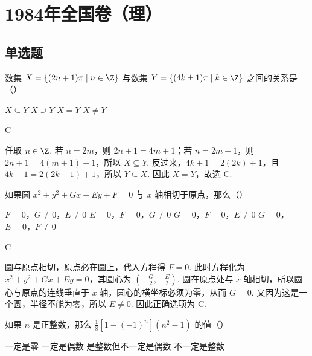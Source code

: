 \chapter{1984年全国卷（理）}

\section{单选题}

\begin{problem}

数集 \(X = \{(2n + 1)\pi\mid n\in\Z\}\) 与数集 \(Y = \{(4k \pm 1)\pi\mid k\in\Z\}\) 之间的关系是（\quad）

\choices
    {\(X \subseteq Y\)}
    {\(X \supseteq Y\)}
    {\(X = Y\)}
    {\(X \neq Y\)}
\end{problem}

\begin{answer}
C
\end{answer}

\begin{solution}
任取 \(n\in\Z\). 若 \(n=2m\)，则 \(2n+1=4m+1\)；若 \(n=2m+1\)，则 \(2n+1=4(m+1)-1\)，所以 \(X\subseteq Y\). 反过来，\(4k+1=2(2k)+1\)，且 \(4k-1=2(2k-1)+1\)，所以 \(Y\subseteq X\). 因此 \(X=Y\)，故选 C.
\end{solution}

\begin{problem}

如果圆 \(x^{2} + y^{2} + Gx + Ey + F = 0\) 与 \(x\) 轴相切于原点，那么（\quad）

\choices
    {\(F = 0\)，\(G \neq 0\)，\(E \neq 0\)}
    {\(E = 0\)，\(F = 0\)，\(G \neq 0\)}
    {\(G = 0\)，\(F = 0\)，\(E \neq 0\)}
    {\(G = 0\)，\(E = 0\)，\(F \neq 0\)}
\end{problem}

\begin{answer}
C
\end{answer}

\begin{solution}
圆与原点相切，原点必在圆上，代入方程得 \(F=0\). 此时方程化为 \(x^{2}+y^{2}+Gx+Ey=0\)，其圆心为 \(\left(-\frac{G}{2},-\frac{E}{2}\right)\). 圆在原点处与 \(x\) 轴相切，所以圆心与原点的连线垂直于 \(x\) 轴，圆心的横坐标必须为零，从而 \(G=0\). 又因为这是一个圆，半径不能为零，所以 \(E\neq0\). 因此正确选项为 C.
\end{solution}

\begin{problem}

如果 \(n\) 是正整数，那么 \(\frac{1}{8}[1 - (-1)^n](n^2 - 1)\) 的值（\quad）

\choices
    {一定是零}
    {一定是偶数}
    {是整数但不一定是偶数}
    {不一定是整数}
\end{problem}

